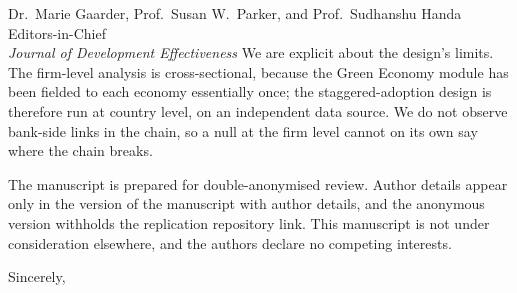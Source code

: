\documentclass[11pt]{letter}
\begin{document}
\begin{letter}{Dr.\ Marie Gaarder, Prof.\ Susan W.\ Parker, and Prof.\ Sudhanshu Handa\\Editors-in-Chief\\\textit{Journal of Development Effectiveness}}
We are explicit about the design's limits. The firm-level analysis is cross-sectional, because the Green Economy module has been fielded to each economy essentially once; the staggered-adoption design is therefore run at country level, on an independent data source. We do not observe bank-side links in the chain, so a null at the firm level cannot on its own say where the chain breaks.

The manuscript is prepared for double-anonymised review. Author details appear only in the version of the manuscript with author details, and the anonymous version withholds the replication repository link. This manuscript is not under consideration elsewhere, and the authors declare no competing interests.

\closing{Sincerely,}

\end{letter}
\end{document}
